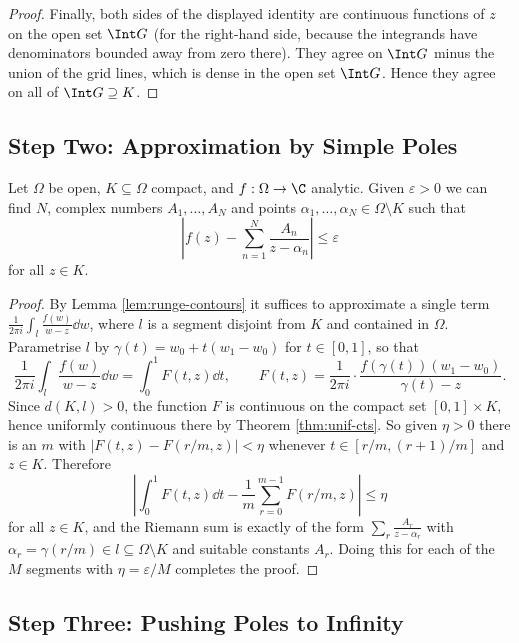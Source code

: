 \begin{proof}
	Finally, both sides of the displayed identity are continuous functions of $z$ on the open set $\Int G$ (for the right-hand side, because the integrands have denominators bounded away from zero there). They agree on $\Int G$ minus the union of the grid lines, which is dense in the open set $\Int G$. Hence they agree on all of $\Int G \supseteq K$.
\end{proof}

\subsection{Step Two: Approximation by Simple Poles}

\begin{lemma}\label{lem:runge-poles}
	Let $\Omega$ be open, $K\subseteq\Omega$ compact, and $f:\Omega\to\C$ analytic. Given $\varepsilon>0$ we can find $N$, complex numbers $A_1,\ldots,A_N$ and points $\alpha_1,\ldots,\alpha_N\in\Omega\setminus K$ such that
	$$\left|f(z)-\sum_{n=1}^N\frac{A_n}{z-\alpha_n}\right|\leq\varepsilon$$
	for all $z\in K$.
\end{lemma}

\begin{proof}
	By Lemma \ref{lem:runge-contours} it suffices to approximate a single term $\frac{1}{2\pi i}\int_l\frac{f(w)}{w-z}\dd w$, where $l$ is a segment disjoint from $K$ and contained in $\Omega$. Parametrise $l$ by $\gamma(t) = w_0+t(w_1-w_0)$ for $t\in[0,1]$, so that
	$$\frac{1}{2\pi i}\int_l\frac{f(w)}{w-z}\dd w = \int_0^1 F(t,z)\dd t, \qquad F(t,z) = \frac{1}{2\pi i}\cdot\frac{f(\gamma(t))(w_1-w_0)}{\gamma(t)-z}.$$
	Since $d(K,l)>0$, the function $F$ is continuous on the compact set $[0,1]\times K$, hence uniformly continuous there by Theorem \ref{thm:unif-cts}. So given $\eta>0$ there is an $m$ with $|F(t,z)-F(r/m,z)|<\eta$ whenever $t\in[r/m,(r+1)/m]$ and $z\in K$. Therefore
	$$\left|\int_0^1F(t,z)\dd t - \frac1m\sum_{r=0}^{m-1}F(r/m,z)\right| \leq \eta$$
	for all $z\in K$, and the Riemann sum is exactly of the form $\sum_r \frac{A_r}{z-\alpha_r}$ with $\alpha_r = \gamma(r/m) \in l\subseteq\Omega\setminus K$ and suitable constants $A_r$. Doing this for each of the $M$ segments with $\eta = \varepsilon/M$ completes the proof.
\end{proof}

\subsection{Step Three: Pushing Poles to Infinity}

